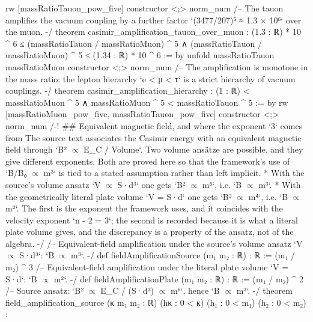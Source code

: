 \documentclass[11pt,a4paper]{article}
\begin{document}
{  rw [massRatioTauon\_\allowbreak{}pow\_\allowbreak{}five]
  constructor \textless{};\textgreater{} norm\_\allowbreak{}num
\mbox{}
/-- The tauon amplifies the vacuum coupling by a further factor
`(3477/207)⁵ ≈ 1.3 × 10⁶` over the muon. -/
theorem casimir\_\allowbreak{}amplification\_\allowbreak{}tauon\_\allowbreak{}over\_\allowbreak{}muon :
    (1.3 : ℝ) * 10 \textasciicircum{} 6 ≤ (massRatioTauon / massRatioMuon) \textasciicircum{} 5 ∧
      (massRatioTauon / massRatioMuon) \textasciicircum{} 5 ≤ (1.34 : ℝ) * 10 \textasciicircum{} 6 := by
  unfold massRatioTauon massRatioMuon
  constructor \textless{};\textgreater{} norm\_\allowbreak{}num
\mbox{}
/-- The amplification is monotone in the mass ratio: the lepton hierarchy
`e \textless{} μ \textless{} τ` is a strict hierarchy of vacuum couplings. -/
theorem casimir\_\allowbreak{}amplification\_\allowbreak{}hierarchy :
    (1 : ℝ) \textless{} massRatioMuon \textasciicircum{} 5 ∧ massRatioMuon \textasciicircum{} 5 \textless{} massRatioTauon \textasciicircum{} 5 := by
  rw [massRatioMuon\_\allowbreak{}pow\_\allowbreak{}five, massRatioTauon\_\allowbreak{}pow\_\allowbreak{}five]
  constructor \textless{};\textgreater{} norm\_\allowbreak{}num
\mbox{}
/-! \#\# Equivalent magnetic field, and where the exponent `3` comes from
\mbox{}
The source text associates the Casimir energy with an equivalent magnetic field
through `B² $\propto$ E\_\allowbreak{}C / Volume`.  Two volume ansätze are possible, and they give
different exponents.  Both are proved here so that the framework's use of
`B/B₀ $\propto$ m³` is tied to a stated assumption rather than left implicit.
\mbox{}
* With the source's volume ansatz `V $\propto$ S·d³` one gets `B² $\propto$ m⁶`, i.e. `B $\propto$ m³`.
* With the geometrically literal plate volume `V = S·d` one gets `B² $\propto$ m⁴`, i.e. `B $\propto$ m²`.
\mbox{}
The first is the exponent the framework uses, and it coincides with the velocity
exponent `n - 2 = 3`; the second is recorded because it is what a literal plate
volume gives, and the discrepancy is a property of the ansatz, not of the
algebra.
-/
\mbox{}
/-- Equivalent-field amplification under the source's volume ansatz `V $\propto$ S·d³`:
`B $\propto$ m³`. -/
def fieldAmplificationSource (m₁ m₂ : ℝ) : ℝ := (m₁ / m₂) \textasciicircum{} 3
\mbox{}
/-- Equivalent-field amplification under the literal plate volume `V = S·d`:
`B $\propto$ m²`. -/
def fieldAmplificationPlate (m₁ m₂ : ℝ) : ℝ := (m₁ / m₂) \textasciicircum{} 2
\mbox{}
/-- Source ansatz: `B² $\propto$ E\_\allowbreak{}C / (S·d³) $\propto$ m⁶`, hence `B $\propto$ m³`. -/
theorem field\_\allowbreak{}amplification\_\allowbreak{}source (κ m₁ m₂ : ℝ) (hκ : 0 \textless{} κ) (h₁ : 0 \textless{} m₁) (h₂ : 0 \textless{} m₂) :
}
\end{document}

